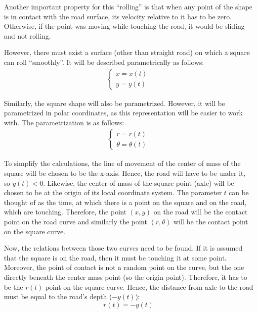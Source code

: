 \documentclass[12pt]{article}
\begin{document}
        Another important property for this ``rolling'' is that when any point of the shape is in contact with the road surface, its velocity relative to it has to be zero. Otherwise, if the point was moving while touching the road, it would be sliding and not rolling.

        However, there must exist a surface (other than straight road) on which a square can roll ``smoothly''. It will be described parametrically as follows:
        \begin{align}
            \begin{cases}
            x = x(t) \\
            y = y(t)
            \end{cases}
        \end{align}

        Similarly, the square shape will also be parametrized. However, it will be parametrized in polar coordinates, as this representation will be easier to work with. The parametrization is as follows: 
        \begin{align}
            \begin{cases}
            r = r(t) \\
            \theta = \theta(t)
            \end{cases}
        \end{align}

        To simplify the calculations, the line of movement of the center of mass of the square will be chosen to be the x-axis. Hence, the road will have to be under it, so $y(t) < 0$. Likewise, the center of mass of the square point (axle) will be chosen to be at the origin of its local coordinate system. The parameter $t$ can be thought of as the time, at which there is a point on the square and on the road, which are touching. Therefore, the point $(x, y)$ on the road will be the contact point on the road curve and similarly the point $(r, \theta)$ will be the contact point on the square curve.

        Now, the relations between those two curves need to be found. If it is assumed that the square is on the road, then it must be touching it at some point. Moreover, the point of contact is not a random point on the curve, but the one directly beneath the center mass point (so the origin point). Therefore, it has to be the $r(t)$ point on the square curve. Hence, the distance from axle to the road must be equal to the road's depth ($-y(t)$):
        \begin{equation}
            r(t) = - y(t)
        \end{equation}
\end{document}
